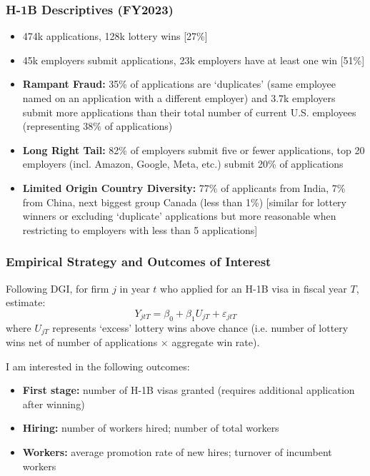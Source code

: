 \documentclass[xcolor=dvipsnames, compress, 12pt, aspectratio=169, handout]{beamer}
\begin{document}
\begin{frame}\label{h1bdesc}
    \frametitle{H-1B Descriptives (FY2023)}
    \begin{itemize}
        \item 474k applications, 128k lottery wins [27\%]
        \item 45k employers submit applications, 23k employers have at least one win [51\%]
        \item \textbf{Rampant Fraud:} 35\% of applications are `duplicates' (same employee named on an application with a different employer) and 3.7k employers submit more applications than their total number of current U.S. employees (representing 38\% of applications)
        \item \textbf{Long Right Tail:} 82\% of employers submit five or fewer applications, top 20 employers (incl. Amazon, Google, Meta, etc.) submit 20\% of applications
        \item \textbf{Limited Origin Country Diversity:} 77\% of applicants from India, 7\% from China, next biggest group Canada (less than 1\%) [similar for lottery winners or excluding `duplicate' applications but more reasonable when restricting to employers with less than 5 applications]
    \end{itemize}    
\end{frame}

\begin{frame}
    \frametitle{Empirical Strategy and Outcomes of Interest}
    Following DGI, for firm $j$ in year $t$ who applied for an H-1B visa in fiscal year $T$, estimate: 
    \begin{equation}
        Y_{jtT} = \beta_0 + \beta_1U_{jT} + \varepsilon_{jtT}
    \end{equation}
    where $U_{jT}$ represents `excess' lottery wins above chance (i.e. number of lottery wins net of number of applications $\times$ aggregate win rate).

    \vspace{2mm}
    I am interested in the following outcomes:
    \begin{itemize}
        \item \textbf{First stage:} number of H-1B visas granted (requires additional application after winning)
        \item \textbf{Hiring:} number of workers hired; number of total workers
        \item \textbf{Workers:} average promotion rate of new hires; turnover of incumbent workers
    \end{itemize}
\end{frame}
\end{document}
